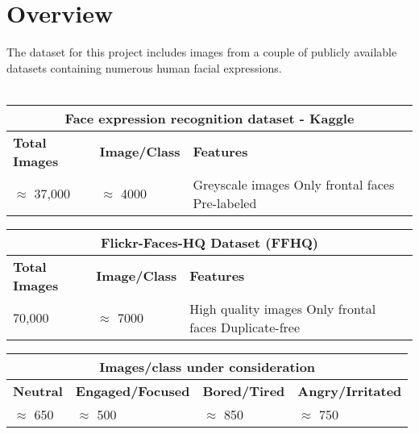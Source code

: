 \section{Overview}
    \noindent The dataset for this project includes images from a couple of publicly available datasets containing numerous human facial expressions.\\\\
\hspace*{1em}
    \begin{tabular}{ |p{3cm}||p{3cm} ||p{3cm} | }
        \hline
        \multicolumn{3}{|c|}{\textbf{Face expression recognition dataset - Kaggle}} \\
        \hline
        \textbf{Total Images} & \textbf{Image/Class } & \textbf{Features}\\
        \hline
        $\approx$ 37,000 & $\approx$ 4000 & Greyscale images Only frontal faces Pre-labeled\\
        \hline
    \end{tabular}
\vspace*{1em}

    \begin{tabular}{ |p{3cm}||p{3cm} ||p{3cm} | }
        \hline
        \multicolumn{3}{|c|}{\textbf{Flickr-Faces-HQ Dataset (FFHQ)}} \\
        \hline
        \textbf{Total Images} & \textbf{Image/Class } & \textbf{Features}\\
        \hline
        70,000 & $\approx$ 7000 & High quality images Only frontal faces Duplicate-free\\
        \hline
    \end{tabular}
    \vspace*{1em}

        \begin{tabular}{ |p{3cm}||p{3cm} ||p{3cm} ||p{3cm} | }
            \hline
            \multicolumn{4}{|c|}{\textbf{Images/class under consideration}} \\
            \hline
            \textbf{Neutral} & \textbf{Engaged/Focused} & \textbf{Bored/Tired} & \textbf{Angry/Irritated} \\
            \hline
            $\approx$ 650 & $\approx$ 500 & $\approx$ 850 & $\approx$ 750\\
            \hline
        \end{tabular}
        \vspace*{1em}
    \vspace*{1em}
